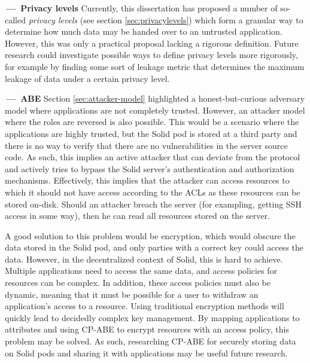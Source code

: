 \newpage
\begin{futurework}\label{fw:privacy-levels}
\textbf{\,---\, Privacy levels} Currently, this dissertation has proposed a number of so-called \textit{privacy levels} (see section \ref{sec:privacylevels}) which form a granular way to determine how much data may be handed over to an untrusted application. However, this was only a practical proposal lacking a rigorous definition. Future research could investigate possible ways to define privacy levels more rigorously, for example by finding some sort of leakage metric that determines the maximum leakage of data under a certain privacy level.
\end{futurework}

\begin{futurework}\label{fw:abe}
\textbf{\,---\, \acrlong{ABE}}
Section \ref{sec:attacker-model} highlighted a honest-but-curious adversary model where applications are not completely trusted. However, an attacker model where the roles are reversed is also possible. This would be a scenario where the applications are highly trusted, but the Solid pod is stored at a third party and there is no way to verify that there are no vulnerabilities in the server source code. As such, this implies an active attacker that can deviate from the protocol and actively tries to bypass the Solid server's authentication and authorization mechanisms. Effectively, this implies that the attacker can access resources to which it should not have access according to the \gls{ACL}s as these resources can be stored on-disk. Should an attacker breach the server (for exampling, getting SSH access in some way), then he can read all resources stored on the server. 

A good solution to this problem would be encryption, which would obscure the data stored in the Solid pod, and only parties with a correct key could access the data. However, in the decentralized context of Solid, this is hard to achieve. Multiple applications need to access the same data, and access policies for resources can be complex. In addition, these access policies must also be dynamic, meaning that it must be possible for a user to withdraw an application's access to a resource. Using traditional encryption methods will quickly lead to decidedly complex key management. By mapping applications to attributes and using \acrlong{CP-ABE} to encrypt resources with an access policy, this problem may be solved. As such, researching \gls{CP-ABE} for securely storing data on Solid pods and sharing it with applications may be useful future research.


\end{futurework}

